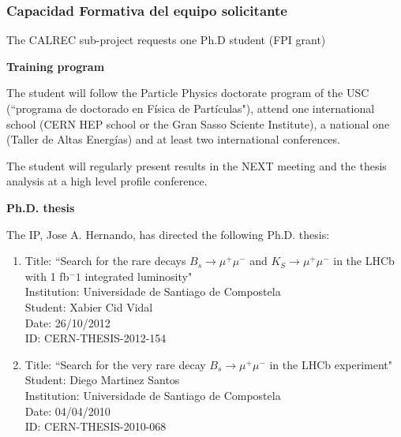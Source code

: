 %
%

\subsubsection*{Capacidad Formativa del equipo solicitante}

The CALREC sub-project requests one Ph.D student (FPI grant)

{\bf Training program}

The student will follow the Particle Physics doctorate program of the USC (``programa de doctorado en F\'isica de Part\'iculas"), attend one international school (CERN HEP school or the Gran Sasso Sciente Institute), a national one (Taller de Altas Energ\'ias) and at least two international conferences.

The student will regularly present results in the NEXT meeting and the thesis analysis at  a high level profile conference.

{\bf Ph.D. thesis}

The IP, Jose A. Hernando, has directed the following Ph.D. thesis:
\begin{enumerate}

\item Title: ``Search for the rare decays $B_s \to \mu^+\mu^-$
and $K_S \to \mu^+\mu^-$ in the LHCb with 1 fb$^-1$ integrated luminosity" \\
Institution: Universidade de Santiago de Compostela \\
Student: Xabier Cid Vidal \\
Date: 26/10/2012 \\
ID: CERN-THESIS-2012-154  

\item Title: ``Search for the very rare decay $B_s \to \mu^+\mu^-$ in the LHCb experiment" \\
Student: Diego Martinez Santos \\
Institution: Universidade de Santiago de Compostela \\
Date: 04/04/2010 \\
ID: CERN-THESIS-2010-068 

\end{enumerate}

